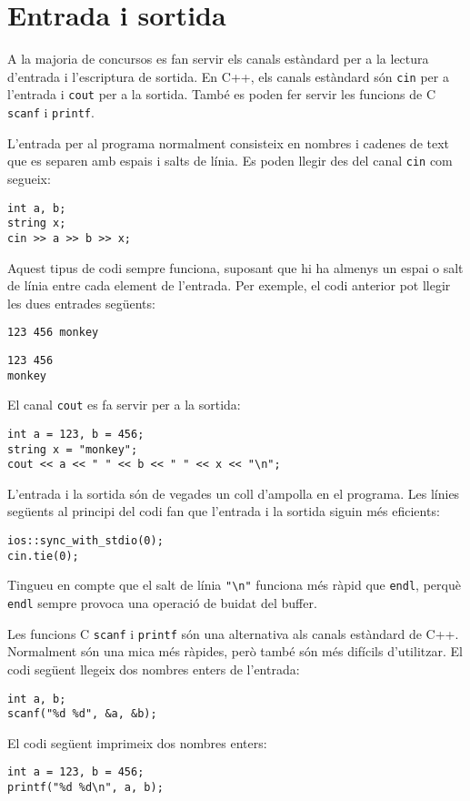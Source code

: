 \section{Entrada i sortida}


A la majoria de concursos es fan servir els canals estàndard
per a la lectura d'entrada i l'escriptura de sortida.
En C++, els canals estàndard són
\texttt{cin} per a l'entrada i \texttt{cout} per a la sortida.
També es poden fer servir les funcions de C
\texttt{scanf} i \texttt{printf}.

L'entrada per al programa normalment consisteix en
nombres i cadenes de text que es separen amb
espais i salts de línia.
Es poden llegir des del canal \texttt{cin}
com segueix:

\begin{lstlisting}
int a, b;
string x;
cin >> a >> b >> x;
\end{lstlisting}

Aquest tipus de codi sempre funciona,
suposant que hi ha almenys un espai
o salt de línia entre cada element de l'entrada.
Per exemple, el codi anterior pot llegir les dues entrades
següents:
\begin{lstlisting}
123 456 monkey
\end{lstlisting}
\begin{lstlisting}
123 456
monkey
\end{lstlisting}
El canal \texttt{cout} es fa servir per a la sortida:
\begin{lstlisting}
int a = 123, b = 456;
string x = "monkey";
cout << a << " " << b << " " << x << "\n";
\end{lstlisting}

L'entrada i la sortida són de vegades
un coll d'ampolla en el programa.
Les línies següents al principi del codi
fan que l'entrada i la sortida siguin
més eficients:

\begin{lstlisting}
ios::sync_with_stdio(0);
cin.tie(0);
\end{lstlisting}

Tingueu en compte que el salt de línia \texttt{"\textbackslash n"}
funciona més ràpid que \texttt{endl},
perquè \texttt{endl} sempre provoca
una operació de buidat del buffer.

Les funcions C \texttt{scanf}
i \texttt{printf} són una alternativa
als canals estàndard de C++.
Normalment són una mica més ràpides,
però també són més difícils d'utilitzar.
El codi següent llegeix dos nombres enters de l'entrada:
\begin{lstlisting}
int a, b;
scanf("%d %d", &a, &b);
\end{lstlisting}
El codi següent imprimeix dos nombres enters:
\begin{lstlisting}
int a = 123, b = 456;
printf("%d %d\n", a, b);
\end{lstlisting}

